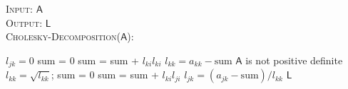 \documentclass[10pt]{article}
\theoremstyle{definition}
\begin{document}
\begin{algorithm}[t]
\caption{Cholesky Decomposition}\label{alg:chol}
\hspace*{\algorithmicindent} {\scshape Input}: $\mathsf{A}$ \\
\hspace*{\algorithmicindent} {\scshape Output}: $\mathsf{L}$ \\
\hspace*{\algorithmicindent} {\scshape Cholesky-Decomposition}($\mathsf{A}$):
\begin{algorithmic}[1]
	   \State $l_{jk} = 0$
      \EndFor
\EndFor
{}
   	\State sum = $0$
   		\State sum = sum + $l_{ki}l_{ki}$
   	\EndFor
   	\State $l_{kk} = a_{kk}- \text{sum}$
   		\State $\mathsf{A}$ is not positive definite
   		\State \Return
    \EndIf
   	\State $l_{kk} = \sqrt{l_{kk}}$;
       	\State sum = $0$
       		\State sum = sum + $l_{ki}l_{ji}$
       	\EndFor
       	\State $l_{jk}=(a_{jk}-\text{sum})/l_{kk}$
    \EndFor
\EndFor
\State \Return $\mathsf{L}$
\end{algorithmic}
\end{algorithm}
\end{document}
